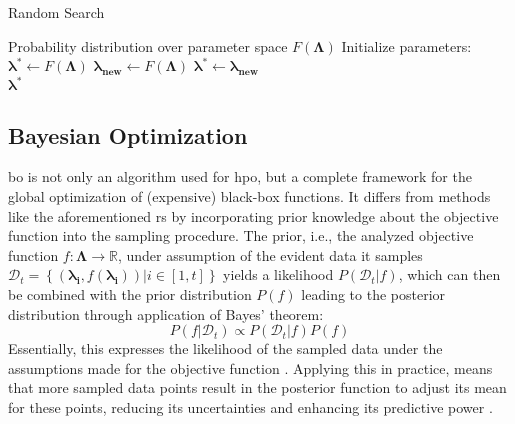 \begin{algorithm}
	\caption{Random Search}
	\label{alg:randomsearch}
	\begin{algorithmic}
		\Require Probability distribution over parameter space $F(\mathbf{\Lambda})$
		\State Initialize parameters: $\mathbf{\lambda^*} \gets F(\mathbf{\Lambda})$
		\Repeat
		\State $\mathbf{\lambda_{\text{new}}} \gets F(\mathbf{\Lambda})$
		\State $\mathbf{\lambda^*} \gets \mathbf{\lambda_{\text{new}}}$
		\EndIf
		\\
		\Return $\mathbf{\lambda^*}$
	\end{algorithmic}
\end{algorithm}


\subsection{Bayesian Optimization}
\label{chap:bo}
\gls{bo} is not only an algorithm used for \gls{hpo}, but a complete framework for the global optimization of (expensive) black-box functions. It differs from methods like the aforementioned \gls{rs} by incorporating prior knowledge about the objective function into the sampling procedure. 
The prior, i.e., the analyzed objective function $f: \mathcal{\mathbf{\Lambda}} \to \mathbb{R}$, under assumption of the evident data it samples $\mathcal{D}_t = \left\lbrace (\mathbf{\lambda_i}, f(\mathbf{\lambda_i})) |  i\in [1,t] \right\rbrace $ yields a likelihood $P(\mathcal{D}_t|f)$, which can then be combined with the prior distribution $P(f)$ leading to the posterior distribution through application of Bayes' theorem:
\begin{equation}
	P(f|\mathcal{D}_t) \propto P(\mathcal{D}_t|f) P(f)
\end{equation}
Essentially, this expresses the likelihood of the sampled data under the assumptions made for the objective function \cite{brochu2010tutorial}. 
Applying this in practice, means that more sampled data points result in the posterior function to adjust its mean for these points, reducing its uncertainties and enhancing its predictive power \cite{williams2006gaussian}. 

